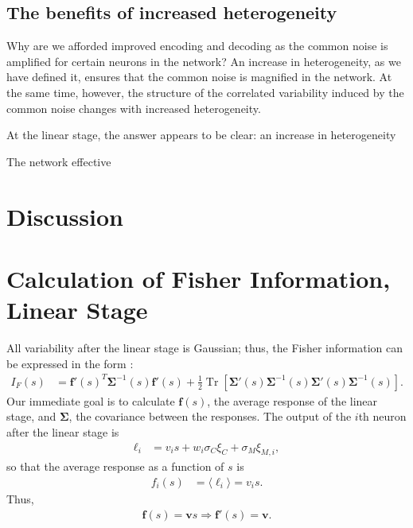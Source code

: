 \documentclass[11pt]{article}
\DeclareMathOperator{\Tr}{Tr}
\begin{document}
\subsection{The benefits of increased heterogeneity}
Why are we afforded improved encoding and decoding as the common noise is amplified for certain neurons in the network? An increase in heterogeneity, as we have defined it, ensures that the common noise is magnified in the network. At the same time, however, the structure of the correlated variability induced by the common noise changes with increased heterogeneity. 

At the linear stage, the answer appears to be clear: an increase in heterogeneity

The network effective

	\begin{figure}[b]
		\centering
		\caption{} 
	\end{figure}	
	\newpage
	\section{Discussion}
	

	\newpage
	\printbibliography

	\newpage
	
	\appendix
	\section{Calculation of  Fisher Information, Linear Stage}\label{app:fisher-linear}
	All variability after the linear stage is Gaussian; thus, the Fisher information can be expressed in the form \cite{1999abbott_dayan, 1993kay}:
	\begin{align}
		I_{F}(s) &= \mathbf{f}'(s)^T \boldsymbol{\Sigma}^{-1} (s) \mathbf{f}'(s) + \frac{1}{2}\Tr\left[\boldsymbol{\Sigma}'(s) \boldsymbol{\Sigma}^{-1}(s)\boldsymbol{\Sigma}'(s) \boldsymbol{\Sigma}^{-1}(s)\right]. \label{IF-gaussian}
	\end{align}
	Our immediate goal is to calculate $\mathbf{f}(s)$, the average response of the linear stage, and $\boldsymbol{\Sigma}$, the covariance between the responses. The output of the $i$th neuron after the linear stage is
	\begin{align}
		\ell_i &= v_i s + w_i \sigma_C \xi_C + \sigma_M\xi_{M,i},
	\end{align}
	so that the average response as a function of $s$ is
	\begin{align}
		f_i(s) &= \langle \ell_i \rangle = v_i s.
	\end{align}
	Thus,
	\begin{align}
		\mathbf{f}(s) = \mathbf{v}s \Rightarrow \mathbf{f}'(s) = \mathbf{v}.
	\end{align}
	
\end{document}
